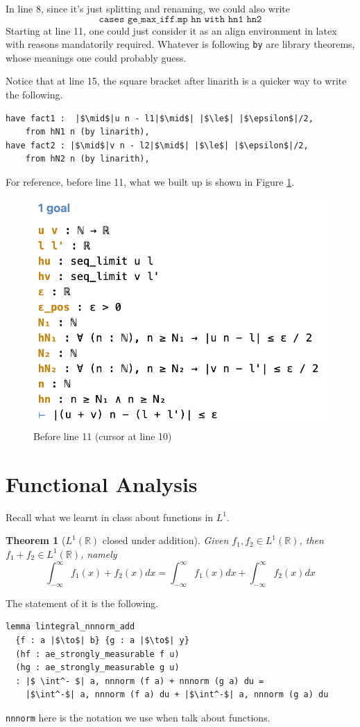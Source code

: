 \documentclass[a4paper]{article}
\newcommand{\R}{\mathbb{R}}
\theoremstyle{bfnote} %
\newtheorem{thm}{Theorem}[section] %
\theoremstyle{bfnote}                  %
\theoremstyle{example}                       %
\theoremstyle{remark}                       %
\numberwithin{equation}{section}
\begin{document}
In line 8, since it's just splitting and renaming, we could also write \[
	\texttt{cases ge\_max\_iff.mp hn with hn1 hn2}
\] 
Starting at line 11, one could just consider it as an align environment in latex with reasons mandatorily required. Whatever is following \texttt{by} are library theorems, whose meanings one could probably guess.

Notice that at line 15, the square bracket after linarith is a quicker way to write the following.
\begin{verbatim}
have fact1 :  |$\mid$|u n - l1|$\mid$| |$\le$| |$\epsilon$|/2,
    from hN1 n (by linarith),
have fact2 : |$\mid$|v n - l2|$\mid$| |$\le$| |$\epsilon$|/2,
    from hN2 n (by linarith),
\end{verbatim}

For reference, before line 11, what we built up is shown in Figure \ref{sequence}.

\begin{figure}[h!]
 \centering
 \includegraphics[width=3 in]{sequence}
 \caption{Before line 11 (cursor at line 10)}
 \label{sequence}
 \end{figure}
\section{Functional Analysis}
Recall what we learnt in class about functions in $L^1$.
\begin{thm}[$L^1(\R)$ closed under addition]
	Given $f_1, f_2 \in L^1(\R)$, then $f_1+f_2 \in L^1(\R)$, namely \[
		\int_{-\infty}^{\infty} f_1(x) + f_2(x) dx = \int_{-\infty}^{\infty} f_1(x) dx + \int_{-\infty}^{\infty} f_2(x) dx
	\] 
\end{thm}
The statement of it is the following.
\begin{listing}[!ht]
\begin{verbatim}
lemma lintegral_nnnorm_add
  {f : a |$\to$| b} {g : a |$\to$| y} 
  (hf : ae_strongly_measurable f u) 
  (hg : ae_strongly_measurable g u) 
  : |$ \int^- $| a, nnnorm (f a) + nnnorm (g a) du = 
  	|$\int^-$| a, nnnorm (f a) du + |$\int^-$| a, nnnorm (g a) du	
\end{verbatim}
\end{listing}
\texttt{nnnorm} here is the notation we use when talk about functions.
\end{document}
